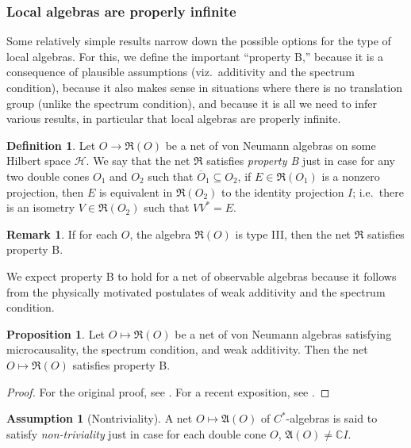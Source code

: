 \documentclass[11pt]{article}
\newcommand{\alg}[1]{\mathfrak{#1}}
\theoremstyle{definition}
\newtheorem{assumption}{Assumption}
\newtheorem{prop}[thm]{Proposition}
\theoremstyle{definition}
\newtheorem{defn}[thm]{Definition}
\newtheorem{note}[thm]{Remark}
\theoremstyle{remark}
\def\2#1{{\mathcal #1}}
\def\7#1{{\mathbb #1}}
\def\ol#1{{\overline #1}}
\begin{document}
\subsubsection{Local algebras are properly infinite}

Some relatively simple results narrow down the possible options for
the type of local algebras.  For this, we define the important
``property B,'' because it is a consequence of plausible assumptions
(viz.\ additivity and the spectrum condition), because it also makes
sense in situations where there is no translation group (unlike the
spectrum condition), and because it is all we need to infer various
results, in particular that local algebras are properly infinite.

\begin{defn} Let $O\to \alg{R}(O)$ be a net of von Neumann algebras on
  some Hilbert space $\2H$.  We say that the net $\alg{R}$ satisfies
  \emph{property B} just in case for any two double cones $O_1$ and
  $O_2$ such that $\ol {O}_1\subseteq O_2$, if $E\in \alg{R}(O_1)$ is
  a nonzero projection, then $E$ is equivalent in $\alg{R}(O_2)$ to
  the identity projection $I$; i.e.\ there is an isometry $V\in
  \alg{R}(O_2)$ such that $VV^*=E$.
\end{defn}

\begin{note} If for each $O$, the algebra $\alg{R}(O)$ is type III, then the net
  $\alg{R}$ satisfies property B.  \end{note}

We expect property B to hold for a net of observable algebras because
it follows from the physically motivated postulates of weak additivity
and the spectrum condition.

\begin{prop} Let $O\mapsto \alg{R}(O)$ be a net of von Neumann
  algebras satisfying microcausality, the spectrum condition, and weak
  additivity.  Then the net $O\mapsto \alg{R}(O)$ satisfies property
  B. \label{prop-B}
\end{prop}

\begin{proof} For the original proof, see \cite{borch}.  For a recent exposition, see
  \cite{antoni}. \end{proof}

\begin{assumption}[Nontriviality] A net $O\mapsto \alg{A}(O)$ of
  $C^*$-algebras is said to satisfy \emph{non-triviality} just in case
  for each double cone $O$, $\alg{A}(O)\neq \7C I$.
\end{assumption}
\end{document}
